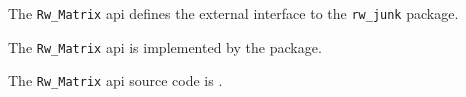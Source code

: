 The {\tt Rw\_Matrix} api defines the external interface to the {\tt rw\_junk} package.

The {\tt Rw\_Matrix} api is implemented by the  package.

The {\tt Rw\_Matrix} api source code is .



